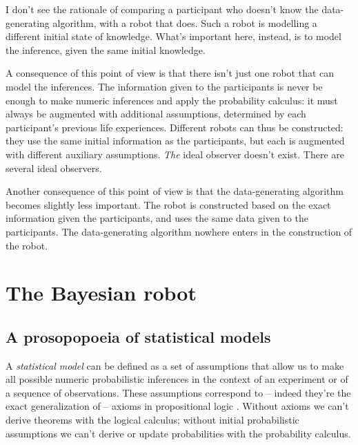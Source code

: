 \documentclass[\ifafour a4paper,12pt,\else a5paper,10pt,\fi%
onecolumn,oneside,article,%
british%
]{memoir}
\theoremstyle{remark}
\theoremstyle{innote}
\newcommand*{\citep}{\parencites}
\renewcommand*{\|}{\mathpunct{|}}
\newcommand*{\chap}{ch.}%
\newcommand*{\cf}{{cf.}}
\begin{document}
I don't see the rationale of comparing a participant who doesn't know the
data-generating algorithm, with a robot that does. Such a robot is
modelling a different initial state of knowledge. What's important here,
instead, is to model the inference, given the same initial knowledge.

A consequence of this point of view is that there isn't just one robot that
can model the inferences. The information given to the participants is
never be enough to make numeric inferences and apply the probability
calculus: it must always be augmented with additional assumptions,
determined by each participant's previous life experiences. Different
robots can thus be constructed: they use the same initial information as
the participants, but each is augmented with different auxiliary
assumptions. \emph{The} ideal observer doesn't exist. There are several
ideal observers.

Another consequence of this point of view is that the data-generating
algorithm becomes slightly less important. The robot is constructed based
on the exact information given the participants, and uses the same data
given to the participants. The data-generating algorithm nowhere enters in
the construction of the robot.

\section{The Bayesian robot}
\label{sec:bayesian_robot}

\subsection{A prosopopoeia of statistical models}
\label{sec:prosopopoeia}

A \emph{statistical model} can be defined as a set of assumptions that
allow us to make all possible numeric probabilistic inferences in the
context of an experiment or of a sequence of observations. These
assumptions correspond to -- indeed they're the exact generalization of --
axioms in propositional logic
\citep{hailperin1996,hailperin2011,jaynes1994_r2003}. Without axioms we
can't derive theorems with the logical calculus; without initial
probabilistic assumptions we can't derive or update probabilities with the
probability calculus.
\end{document}
